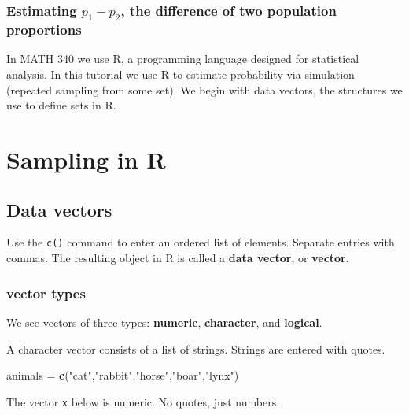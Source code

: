 \documentclass[
]{book}
\newenvironment{Shaded}{\begin{snugshade}}{\end{snugshade}}
\newcommand{\FunctionTok}[1]{\textcolor[rgb]{0.13,0.29,0.53}{\textbf{#1}}}
\newcommand{\NormalTok}[1]{#1}
\newcommand{\OtherTok}[1]{\textcolor[rgb]{0.56,0.35,0.01}{#1}}
\newcommand{\StringTok}[1]{\textcolor[rgb]{0.31,0.60,0.02}{#1}}
\theoremstyle{definition}
\theoremstyle{definition}
\theoremstyle{definition}
\theoremstyle{definition}
\theoremstyle{remark}
\begin{document}
\subsection{\texorpdfstring{Estimating \(p_1 - p_2\), the difference of two population proportions}{Estimating p\_1 - p\_2, the difference of two population proportions}}\label{estimating-p_1---p_2-the-difference-of-two-population-proportions}

\appendix


In MATH 340 we use R, a programming language designed for statistical analysis. In this tutorial we use R to estimate probability via simulation (repeated sampling from some set). We begin with data vectors, the structures we use to define sets in R.

\chapter{Sampling in R}\label{sampling-in-r}

\section{Data vectors}\label{vectors-R}

Use the \texttt{c()} command to enter an ordered list of elements. Separate entries with commas. The resulting object in R is called a \textbf{data vector}, or \textbf{vector}.

\subsection*{vector types}\label{vector-types}

We see vectors of three types: \textbf{numeric}, \textbf{character}, and \textbf{logical}.

A character vector consists of a list of strings. Strings are entered with quotes.

\begin{Shaded}
\begin{Highlighting}[]
\NormalTok{animals }\OtherTok{=} \FunctionTok{c}\NormalTok{(}\StringTok{"cat"}\NormalTok{,}\StringTok{"rabbit"}\NormalTok{,}\StringTok{"horse"}\NormalTok{,}\StringTok{"boar"}\NormalTok{,}\StringTok{"lynx"}\NormalTok{)}
\end{Highlighting}
\end{Shaded}

The vector \texttt{x} below is numeric. No quotes, just numbers.
\end{document}
